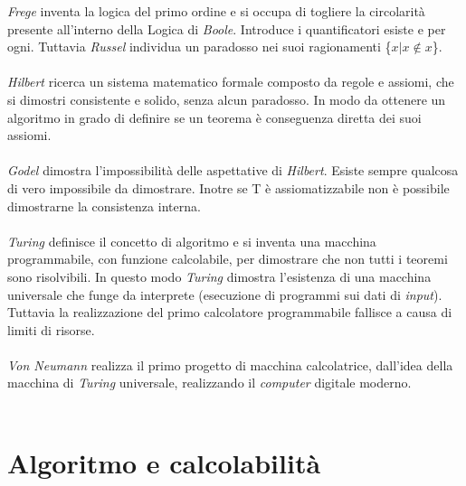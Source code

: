 \documentclass[10pt,a4paper]{book}
\begin{document}
\textit{Frege} inventa la logica del primo ordine e si occupa di togliere la circolarit\`a presente all'interno della Logica di \textit{Boole}. Introduce i quantificatori esiste e per ogni. Tuttavia \textit{Russel} individua un paradosso nei suoi ragionamenti \{$x | x \notin x$\}.\\\\
\noindent
\textit{Hilbert} ricerca un sistema matematico formale composto da regole e assiomi, che si dimostri consistente e solido, senza alcun paradosso. In modo da ottenere un algoritmo in grado di definire se un teorema \`e conseguenza diretta dei suoi assiomi.\\\\
\textit{Godel} dimostra l'impossibilit\`a delle aspettative di \textit{Hilbert}. Esiste sempre qualcosa di vero impossibile da dimostrare. Inotre se T \`e assiomatizzabile non \`e possibile dimostrarne la consistenza interna.\\\\
\textit{Turing} definisce il concetto di algoritmo e si inventa una macchina programmabile, con funzione calcolabile, per dimostrare che non tutti i teoremi sono risolvibili. In questo modo \textit{Turing} dimostra l'esistenza di una macchina universale che funge da interprete (esecuzione di programmi sui dati di \textit{input}). Tuttavia la realizzazione del primo calcolatore programmabile fallisce a causa di limiti di risorse.\\\\
\textit{Von Neumann} realizza il primo progetto di macchina calcolatrice, dall'idea della macchina di \textit{Turing} universale, realizzando il \textit{computer} digitale moderno.\\\\
\pagebreak

\chapter{Algoritmo e calcolabilit\`a}
\end{document}
